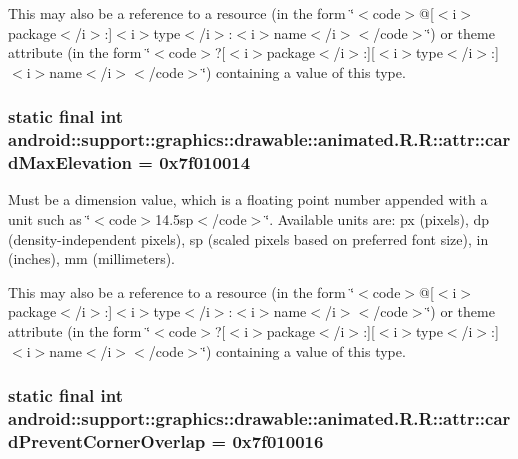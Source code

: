 This may also be a reference to a resource (in the form \char`\"{}$<$code$>$@\mbox{[}$<$i$>$package$<$/i$>$:\mbox{]}$<$i$>$type$<$/i$>$:$<$i$>$name$<$/i$>$$<$/code$>$\char`\"{}) or theme attribute (in the form \char`\"{}$<$code$>$?\mbox{[}$<$i$>$package$<$/i$>$:\mbox{]}\mbox{[}$<$i$>$type$<$/i$>$:\mbox{]}$<$i$>$name$<$/i$>$$<$/code$>$\char`\"{}) containing a value of this type. \hypertarget{classandroid_1_1support_1_1graphics_1_1drawable_1_1animated_1_1_r_1_1attr_13c52d1cb7813f40604ef8039bfd475f}{
\subsubsection[{cardMaxElevation}]{\setlength{\rightskip}{0pt plus 5cm}static final int android::support::graphics::drawable::animated.R.R::attr::cardMaxElevation = 0x7f010014}}
\label{classandroid_1_1support_1_1graphics_1_1drawable_1_1animated_1_1_r_1_1attr_13c52d1cb7813f40604ef8039bfd475f}


Must be a dimension value, which is a floating point number appended with a unit such as \char`\"{}$<$code$>$14.5sp$<$/code$>$\char`\"{}. Available units are: px (pixels), dp (density-independent pixels), sp (scaled pixels based on preferred font size), in (inches), mm (millimeters). 

This may also be a reference to a resource (in the form \char`\"{}$<$code$>$@\mbox{[}$<$i$>$package$<$/i$>$:\mbox{]}$<$i$>$type$<$/i$>$:$<$i$>$name$<$/i$>$$<$/code$>$\char`\"{}) or theme attribute (in the form \char`\"{}$<$code$>$?\mbox{[}$<$i$>$package$<$/i$>$:\mbox{]}\mbox{[}$<$i$>$type$<$/i$>$:\mbox{]}$<$i$>$name$<$/i$>$$<$/code$>$\char`\"{}) containing a value of this type. \hypertarget{classandroid_1_1support_1_1graphics_1_1drawable_1_1animated_1_1_r_1_1attr_77616497e904a4f3da0f3c3350b47544}{
\subsubsection[{cardPreventCornerOverlap}]{\setlength{\rightskip}{0pt plus 5cm}static final int android::support::graphics::drawable::animated.R.R::attr::cardPreventCornerOverlap = 0x7f010016}}
\label{classandroid_1_1support_1_1graphics_1_1drawable_1_1animated_1_1_r_1_1attr_77616497e904a4f3da0f3c3350b47544}


